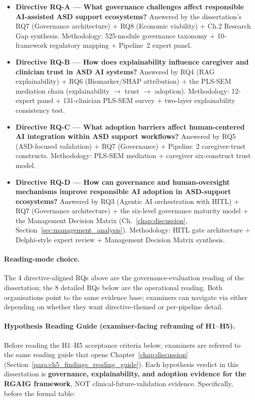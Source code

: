 \begin{itemize}[leftmargin=*, itemsep=3pt]
    \item \textbf{Directive RQ-A — What governance challenges affect responsible AI-assisted ASD support ecosystems?} Answered by the dissertation's RQ7 (Governance architecture) + RQ8 (Economic viability) + Ch.2 Research Gap synthesis. Methodology: 525-module governance taxonomy + 10-framework regulatory mapping + Pipeline~2 expert panel.
    \item \textbf{Directive RQ-B — How does explainability influence caregiver and clinician trust in ASD AI systems?} Answered by RQ4 (RAG explainability) + RQ6 (Biomarker/SHAP attribution) + the PLS-SEM mediation chain (explainability $\to$ trust $\to$ adoption). Methodology: 12-expert panel + 131-clinician PLS-SEM survey + two-layer explainability consistency test.
    \item \textbf{Directive RQ-C — What adoption barriers affect human-centered AI integration within ASD support workflows?} Answered by RQ5 (ASD-focused validation) + RQ7 (Governance) + Pipeline~2 caregiver-trust constructs. Methodology: PLS-SEM mediation + caregiver six-construct trust model.
    \item \textbf{Directive RQ-D — How can governance and human-oversight mechanisms improve responsible AI adoption in ASD-support ecosystems?} Answered by RQ3 (Agentic AI orchestration with HITL) + RQ7 (Governance architecture) + the six-level governance maturity model + the Management Decision Matrix (Ch.~\ref{chap:discussion}, Section~\ref{sec:management_analysis}). Methodology: HITL gate architecture + Delphi-style expert review + Management Decision Matrix synthesis.
\end{itemize}

\paragraph{Reading-mode choice.} The 4 directive-aligned RQs above are the governance-evaluation reading of the dissertation; the 8 detailed RQs below are the operational reading. Both organisations point to the same evidence base; examiners can navigate via either depending on whether they want directive-themed or per-pipeline detail.

\paragraph{Hypothesis Reading Guide (examiner-facing reframing of H1--H5).}
\label{para:hypothesis_reading_guide_ch1}
Before reading the H1--H5 acceptance criteria below, examiners are referred to the same reading guide that opens Chapter~\ref{chap:discussion} (Section~\ref{para:ch5_findings_reading_guide}). Each hypothesis verdict in this dissertation is \textbf{governance, explainability, and adoption evidence for the RGAIG framework}, NOT clinical-future-validation evidence. Specifically, before the formal table:

